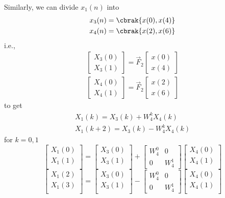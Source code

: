 \documentclass[journal,12pt,twocolumn]{IEEEtran}
\newcommand{\mymat}[1]{\ensuremath{\begin{bmatrix}#1\end{bmatrix}}}
\renewcommand\thesection{\arabic{section}}
\begin{document}
\begin{enumerate}[label=\arabic*.,ref=\thesection.\theenumi]
	Similarly, we can divide $x_1(n)$ into 
	\begin{align}
		x_3(n) = \cbrak{x(0), x(4)} \\
		x_4(n) = \cbrak{x(2), x(6)}
	\end{align}
	i.e.,
	\begin{align}
		\mymat{X_3(0) \\ X_3(1)} = \vec{F}_2 \mymat{x(0) \\ x(4)} \\
		\mymat{X_4(0) \\ X_4(1)} = \vec{F}_2 \mymat{x(2) \\ x(6)}
	\end{align}
	to get
	\begin{align}
		X_1(k) = X_3(k) + W_4^k X_4(k) \\
		X_1(k + 2) = X_3(k) - W_4^k X_4(k) 
	\end{align}
	for $k = 0, 1$
	\begin{equation}
\begin{bmatrix}
X_{1}(0) \\ 
X_{1}(1)\\ 
\end{bmatrix}
=
\begin{bmatrix}
X_{3}(0) \\ 
X_{3}(1)\\ 
\end{bmatrix}
+
\begin{bmatrix}
W^{0}_{4} & 0\\
0 & W^{1}_{4}
\end{bmatrix}
\begin{bmatrix}
X_{4}(0) \\ 
X_{4}(1) \\ 
\end{bmatrix}
\end{equation}
\begin{equation}
\begin{bmatrix}
X_{1}(2) \\ 
X_{1}(3)\\ 
\end{bmatrix}
=
\begin{bmatrix}
X_{3}(0) \\ 
X_{3}(1)\\ 
\end{bmatrix}
-
\begin{bmatrix}
W^{0}_{4} & 0\\
0 & W^{1}_{4}
\end{bmatrix}
\begin{bmatrix}
X_{4}(0) \\ 
X_{4}(1) \\ 
\end{bmatrix}
\end{equation}


\end{enumerate}
\end{document}

